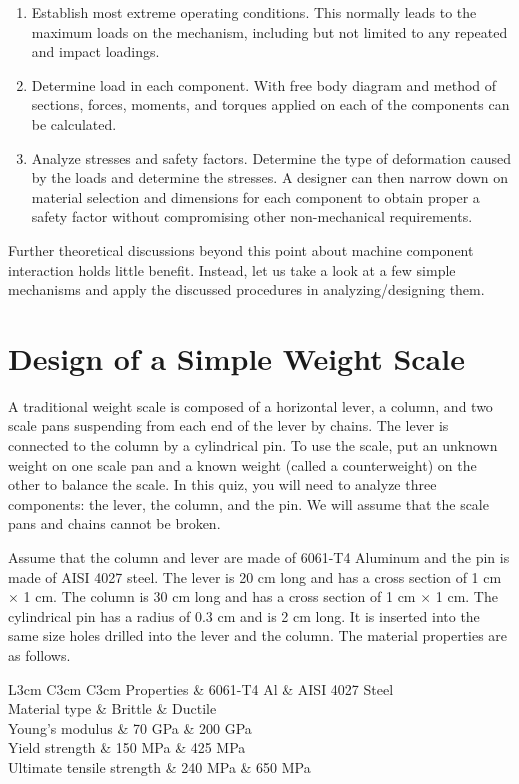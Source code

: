 \documentclass[a4paper,openany,12pt]{book}
\begin{document}
{{\begin{enumerate}
\item Establish most extreme operating conditions. This normally leads to
the maximum loads on the mechanism, including but not limited to any
repeated and impact loadings.

\item Determine load in each component. With free body diagram and method
of sections, forces, moments, and torques applied on each of the
components can be calculated.

\item Analyze stresses and safety factors. Determine the type of
deformation caused by the loads and determine the stresses. A
designer can then narrow down on material selection and dimensions
for each component to obtain proper a safety factor without
compromising other non-mechanical requirements.
\end{enumerate}

Further theoretical discussions beyond this point about machine
component interaction holds little benefit. Instead, let us take a look
at a few simple mechanisms and apply the discussed procedures in
analyzing/designing them.

\section{Design of a Simple Weight Scale}
\label{sec:org2e2dc31}
A traditional weight scale is composed of a horizontal lever, a column,
and two scale pans suspending from each end of the lever by chains. The
lever is connected to the column by a cylindrical pin. To use the scale,
put an unknown weight on one scale pan and a known weight (called a
counterweight) on the other to balance the scale. In this quiz, you will
need to analyze three components: the lever, the column, and the pin. We
will assume that the scale pans and chains cannot be broken.


Assume that the column and lever are made of 6061-T4 Aluminum and the
pin is made of AISI 4027 steel. The lever is 20 cm long and has a cross
section of 1 cm \(\times\) 1 cm. The column is 30 cm long and has a cross
section of 1 cm \(\times\) 1 cm. The cylindrical pin has a radius of 0.3
cm and is 2 cm long. It is inserted into the same size holes drilled
into the lever and the column. The material properties are as follows.


 L3cm C3cm C3cm Properties \& 6061-T4 Al \& AISI 4027 Steel\\
Material type \& Brittle \& Ductile\\
Young's modulus \& 70 GPa \& 200 GPa\\
Yield strength \& 150 MPa \& 425 MPa\\
Ultimate tensile strength \& 240 MPa \& 650 MPa\\

}}
\end{document}
